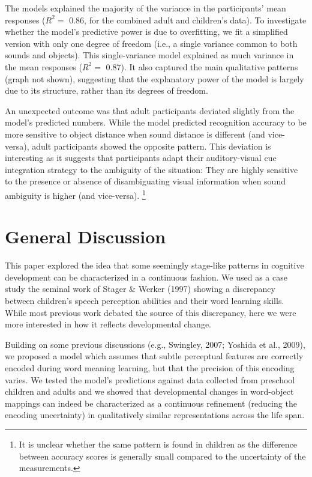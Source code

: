 \documentclass[10pt, letterpaper]{article}
\begin{document}
The models explained the majority of the variance in the participants'
mean responses (\(R^2=\) 0.86, for the combined adult and children's
data). To investigate whether the model's predictive power is due to
overfitting, we fit a simplified version with only one degree of freedom
(i.e., a single variance common to both sounds and objects). This
single-variance model explained as much variance in the mean responses
(\(R^2=\) 0.87). It also captured the main qualitative patterns (graph
not shown), suggesting that the explanatory power of the model is
largely due to its structure, rather than its degrees of freedom.

An unexpected outcome was that adult participants deviated slightly from
the model's predicted numbers. While the model predicted recognition
accuracy to be more sensitive to object distance when sound distance is
different (and vice-versa), adult participants showed the opposite
pattern. This deviation is interesting as it suggests that participants
adapt their auditory-visual cue integration strategy to the ambiguity of
the situation: They are highly sensitive to the presence or absence of
disambiguating visual information when sound ambiguity is higher (and
vice-versa).
\footnote{It is unclear whether the same pattern is found in children as the difference between accuracy scores is generally small compared to the uncertainty of the measurements.}

\section{General Discussion}\label{general-discussion}

This paper explored the idea that some seemingly stage-like patterns in
cognitive development can be characterized in a continuous fashion. We
used as a case study the seminal work of Stager \& Werker (1997) showing
a discrepancy between children's speech perception abilities and their
word learning skills. While most previous work debated the source of
this discrepancy, here we were more interested in how it reflects
developmental change.

Building on some previous discussions (e.g., Swingley, 2007; Yoshida et
al., 2009), we proposed a model which assumes that subtle perceptual
features are correctly encoded during word meaning learning, but that
the precision of this encoding varies. We tested the model's predictions
against data collected from preschool children and adults and we showed
that developmental changes in word-object mappings can indeed be
characterized as a continuous refinement (reducing the encoding
uncertainty) in qualitatively similar representations across the life
span.
\end{document}
